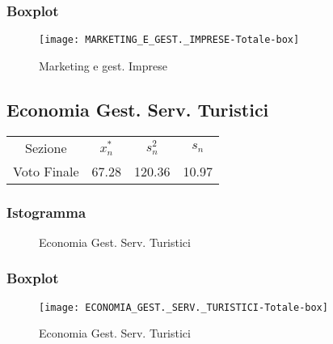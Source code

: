 \subsubsection{Boxplot}
\begin{figure}[!h]
  \centering
  \texttt{[image: MARKETING\_E\_GEST.\_IMPRESE-Totale-box]}
  \caption{Marketing e gest. Imprese}
\end{figure}
\restoregeometry
\clearpage

\thispagestyle{empty} %
\subsection{Economia Gest. Serv. Turistici}

\begin{center}
\begin{tabular}{cccc}
  \toprule
  Sezione & \(x_{n}^{*}\) & \(s_n^2\) & \(s_n\) \\
  Voto Finale & 67.28 & 120.36 & 10.97 \\
  \bottomrule
\end{tabular}
\end{center}

\subsubsection{Istogramma}
\begin{figure}[!h]
  \caption{Economia Gest. Serv. Turistici}
\end{figure}

\subsubsection{Boxplot}
\begin{figure}[!h]
  \centering
  \texttt{[image: ECONOMIA\_GEST.\_SERV.\_TURISTICI-Totale-box]}
  \caption{Economia Gest. Serv. Turistici}
\end{figure}
\restoregeometry
\clearpage

